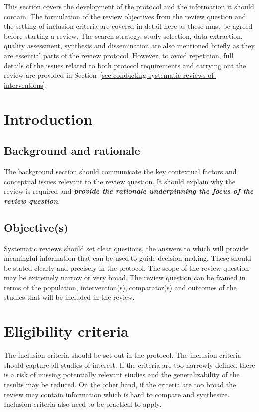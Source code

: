 \documentclass[
  11pt,
  a4paper,
  DIV=11,
  numbers=noendperiod]{scrreprt}
\begin{document}
This section covers the development of the protocol and the information
it should contain. The formulation of the review objectives from the
review question and the setting of inclusion criteria are covered in
detail here as these must be agreed before starting a review. The search
strategy, study selection, data extraction, quality assessment,
synthesis and dissemination are also mentioned briefly as they are
essential parts of the review protocol. However, to avoid repetition,
full details of the issues related to both protocol requirements and
carrying out the review are provided in
Section~\ref{sec-conducting-systematic-reviews-of-interventions}.

\section{Introduction}\label{introduction-1}

\subsection{Background and rationale}\label{background-and-rationale}

The background section should communicate the key contextual factors and
conceptual issues relevant to the review question. It should explain why
the review is required and \textbf{\emph{provide the rationale
underpinning the focus of the review question}}.

\subsection{Objective(s)}\label{objectives}

Systematic reviews should set clear questions, the answers to which will
provide meaningful information that can be used to guide
decision-making. These should be stated clearly and precisely in the
protocol. The scope of the review question may be extremely narrow or
very broad. The review question can be framed in terms of the
population, intervention(s), comparator(s) and outcomes of the studies
that will be included in the review.

\section{Eligibility criteria}\label{eligibility-criteria}

The inclusion criteria should be set out in the protocol. The inclusion
criteria should capture all studies of interest. If the criteria are too
narrowly defined there is a risk of missing potentially relevant studies
and the generalizability of the results may be reduced. On the other
hand, if the criteria are too broad the review may contain information
which is hard to compare and synthesize. Inclusion criteria also need to
be practical to apply.
\end{document}
